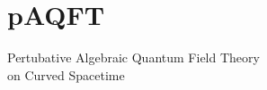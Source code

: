 \documentclass[9pt]{beamer}
\begin{document}
\section{pAQFT}

{
\begin{frame}
\bf
\vspace*{30pt}
\begin{exampleblock}{\vspace*{-3ex}}
\begin{center}
\Large Pertubative Algebraic Quantum Field Theory \\[10pt] on Curved Spacetime
\end{center}
\end{exampleblock}
\end{frame}
}

\end{document}
